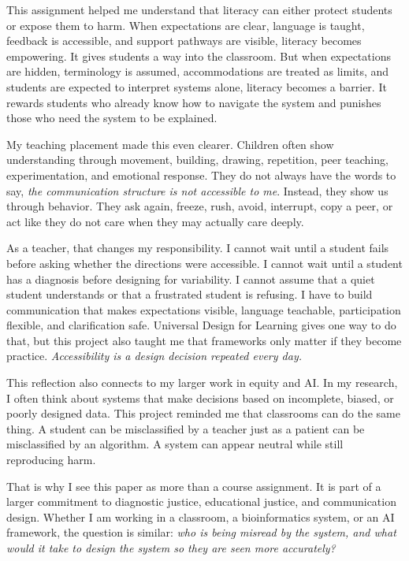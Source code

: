 \documentclass[11pt]{article}
\begin{document}
This assignment helped me understand that literacy can either protect students or expose them to harm. When expectations are clear, language is taught, feedback is accessible, and support pathways are visible, literacy becomes empowering. It gives students a way into the classroom. But when expectations are hidden, terminology is assumed, accommodations are treated as limits, and students are expected to interpret systems alone, literacy becomes a barrier. It rewards students who already know how to navigate the system and punishes those who need the system to be explained.

My teaching placement made this even clearer. Children often show understanding through movement, building, drawing, repetition, peer teaching, experimentation, and emotional response. They do not always have the words to say, \textit{the communication structure is not accessible to me}. Instead, they show us through behavior. They ask again, freeze, rush, avoid, interrupt, copy a peer, or act like they do not care when they may actually care deeply.

As a teacher, that changes my responsibility. I cannot wait until a student fails before asking whether the directions were accessible. I cannot wait until a student has a diagnosis before designing for variability. I cannot assume that a quiet student understands or that a frustrated student is refusing. I have to build communication that makes expectations visible, language teachable, participation flexible, and clarification safe. Universal Design for Learning gives one way to do that, but this project also taught me that frameworks only matter if they become practice. \textit{Accessibility is a design decision repeated every day.}

This reflection also connects to my larger work in equity and AI. In my research, I often think about systems that make decisions based on incomplete, biased, or poorly designed data. This project reminded me that classrooms can do the same thing. A student can be misclassified by a teacher just as a patient can be misclassified by an algorithm. A system can appear neutral while still reproducing harm.

That is why I see this paper as more than a course assignment. It is part of a larger commitment to diagnostic justice, educational justice, and communication design. Whether I am working in a classroom, a bioinformatics system, or an AI framework, the question is similar: \textit{who is being misread by the system, and what would it take to design the system so they are seen more accurately?}
\end{document}
